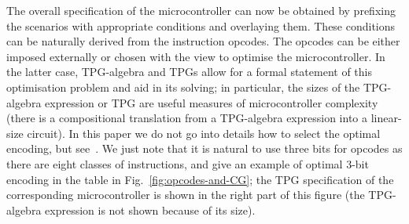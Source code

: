 The overall specification of the microcontroller can now be obtained
by prefixing the scenarios with appropriate conditions and overlaying
them. These conditions can be naturally derived from the instruction
opcodes. The opcodes can be either imposed externally or chosen with
the view to optimise the microcontroller. In the latter case, TPG-algebra
and TPGs allow for a formal statement of this optimisation problem
and aid in its solving; in particular, the sizes of the TPG-algebra
expression or TPG are useful measures of microcontroller complexity
(there is a compositional translation from a TPG-algebra expression
into a linear-size circuit). In this paper we do not go into details
how to select the optimal encoding, but see~\cite{2011_mokhov_iet}.
We just note that it is natural to use three bits for opcodes as there
are eight classes of instructions, and give an example of optimal
3-bit encoding in the table in Fig.~\ref{fig:opcodes-and-CG}; the
TPG specification of the corresponding microcontroller is shown in
the right part of this figure (the TPG-algebra expression is not shown
because of its size).
